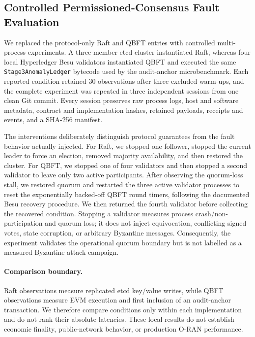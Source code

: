
\subsection{Controlled Permissioned-Consensus Fault Evaluation}
\label{sec:permissioned-faults}

We replaced the protocol-only Raft and QBFT entries with controlled
multi-process experiments.  A three-member etcd cluster instantiated Raft,
whereas four local Hyperledger Besu validators instantiated QBFT and executed
the same \texttt{Stage3AnomalyLedger} bytecode used by the audit-anchor
microbenchmark.  Each reported condition retained 30 observations after three
excluded warm-ups, and the complete experiment was repeated in three
independent sessions from one clean Git commit.  Every session preserves raw
process logs, host and software metadata, contract and implementation hashes,
retained payloads, receipts and events, and a SHA-256 manifest.

The interventions deliberately distinguish protocol guarantees from the fault
behavior actually injected.  For Raft, we stopped one follower, stopped the
current leader to force an election, removed majority availability, and then
restored the cluster.  For QBFT, we stopped one of four validators and then stopped
a second validator to leave only two active participants.  After observing the
quorum-loss stall, we restored quorum and restarted the three active validator
processes to reset the exponentially backed-off QBFT round timers, following
the documented Besu recovery procedure.  We then returned the fourth validator
before collecting the recovered condition.  Stopping a validator measures process
crash/non-participation and quorum loss; it does not inject equivocation,
conflicting signed votes, state corruption, or arbitrary Byzantine messages.
Consequently, the experiment validates the operational quorum boundary but is
not labelled as a measured Byzantine-attack campaign.


\paragraph{Comparison boundary.}
Raft observations measure replicated etcd key/value writes, while QBFT
observations measure EVM execution and first inclusion of an audit-anchor
transaction.  We therefore compare conditions only within each implementation
and do not rank their absolute latencies.  These local results do not establish
economic finality, public-network behavior, or production O-RAN performance.
